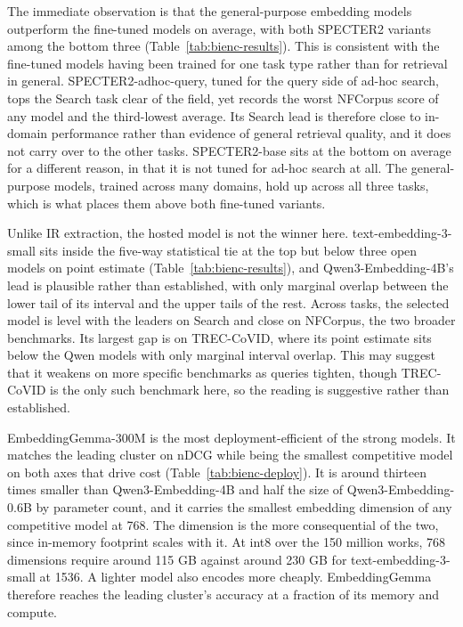 The immediate observation is that the general-purpose embedding models outperform the fine-tuned models on average, with both SPECTER2 variants among the bottom three (Table~\ref{tab:bienc-results}). This is consistent with the fine-tuned models having been trained for one task type rather than for retrieval in general. SPECTER2-adhoc-query, tuned for the query side of ad-hoc search, tops the Search task clear of the field, yet records the worst NFCorpus score of any model and the third-lowest average. Its Search lead is therefore close to in-domain performance rather than evidence of general retrieval quality, and it does not carry over to the other tasks. SPECTER2-base sits at the bottom on average for a different reason, in that it is not tuned for ad-hoc search at all. The general-purpose models, trained across many domains, hold up across all three tasks, which is what places them above both fine-tuned variants.

Unlike IR extraction, the hosted model is not the winner here. text-embedding-3-small sits inside the five-way statistical tie at the top but below three open models on point estimate (Table~\ref{tab:bienc-results}), and Qwen3-Embedding-4B's lead is plausible rather than established, with only marginal overlap between the lower tail of its interval and the upper tails of the rest. Across tasks, the selected model is level with the leaders on Search and close on NFCorpus, the two broader benchmarks. Its largest gap is on TREC-CoVID, where its point estimate sits below the Qwen models with only marginal interval overlap. This may suggest that it weakens on more specific benchmarks as queries tighten, though TREC-CoVID is the only such benchmark here, so the reading is suggestive rather than established.

EmbeddingGemma-300M is the most deployment-efficient of the strong models. It matches the leading cluster on nDCG while being the smallest competitive model on both axes that drive cost (Table~\ref{tab:bienc-deploy}). It is around thirteen times smaller than Qwen3-Embedding-4B and half the size of Qwen3-Embedding-0.6B by parameter count, and it carries the smallest embedding dimension of any competitive model at 768. The dimension is the more consequential of the two, since in-memory footprint scales with it. At int8 over the 150 million works, 768 dimensions require around 115 GB against around 230 GB for text-embedding-3-small at 1536. A lighter model also encodes more cheaply. EmbeddingGemma therefore reaches the leading cluster's accuracy at a fraction of its memory and compute.

